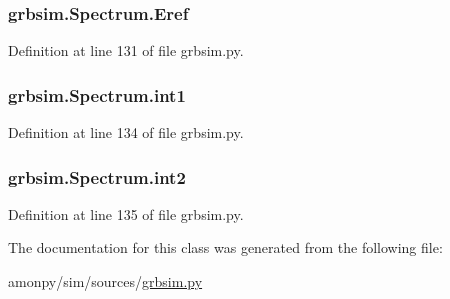 \hypertarget{classgrbsim_1_1_spectrum_a260c3c6b38ee0881d09c7d2f9fb75fa1}{
\subsubsection[{Eref}]{\setlength{\rightskip}{0pt plus 5cm}grbsim.\-Spectrum.\-Eref}}\label{classgrbsim_1_1_spectrum_a260c3c6b38ee0881d09c7d2f9fb75fa1}


Definition at line 131 of file grbsim.\-py.

\hypertarget{classgrbsim_1_1_spectrum_aec39bd12a4d93afc29ce1c7126326ded}{
\subsubsection[{int1}]{\setlength{\rightskip}{0pt plus 5cm}grbsim.\-Spectrum.\-int1}}\label{classgrbsim_1_1_spectrum_aec39bd12a4d93afc29ce1c7126326ded}


Definition at line 134 of file grbsim.\-py.

\hypertarget{classgrbsim_1_1_spectrum_aa1856fabc3f7956b95a3ecddbd4af6e4}{
\subsubsection[{int2}]{\setlength{\rightskip}{0pt plus 5cm}grbsim.\-Spectrum.\-int2}}\label{classgrbsim_1_1_spectrum_aa1856fabc3f7956b95a3ecddbd4af6e4}


Definition at line 135 of file grbsim.\-py.



The documentation for this class was generated from the following file\-:\begin{DoxyCompactItemize}
\item 
amonpy/sim/sources/\hyperlink{grbsim_8py}{grbsim.\-py}\end{DoxyCompactItemize}
